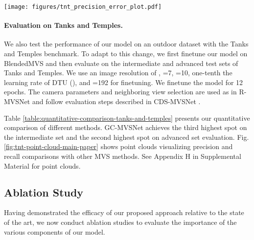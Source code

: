 \documentclass[10pt,twocolumn,letterpaper]{article}
\begin{document}
\begin{figure*}[t]
\begin{center}
    \vspace{-12pt}
    \texttt{[image: figures/tnt\_precision\_error\_plot.pdf]}
    \vspace{-13pt}
    \caption{Precision and recall comparison with other methods \cite{gu2019casmvsnet, yao2019recurrent, ma2021epp} for Train on Tanks and Temples benchmark.  is the scene-relevant distance threshold. Darker regions indicate larger error encountered with regard to . GC-MVSNet shows visual improvements with brighter regions for precision as well as recall metric.}
    \label{fig:tnt-point-cloud-main-paper}
    \vspace{-25pt}
\end{center}
\end{figure*}


\vspace{-12.5pt}
\paragraph{Evaluation on Tanks and Temples.}
We also test the
performance of our model on an outdoor dataset with the Tanks and Temples benchmark. To
adapt to this change, we first finetune our model on BlendedMVS and then
evaluate on the intermediate and advanced test sets of Tanks and Temples. We use an image
resolution of , =7, =10, one-tenth the learning rate of DTU (),
and =192 for finetuning. We finetune the model for 12 epochs.
The camera parameters and neighboring view
selection are used as in R-MVSNet \cite{yao2019recurrent} 
and follow
evaluation steps described in CDS-MVSNet
\cite{giang2022curvatureguided}.

Table
\ref{table:quantitative-comparison-tanks-and-temples} presents our
quantitative comparison of different methods. GC-MVSNet achieves the 
third highest spot on the intermediate set and the second highest spot on advanced set
evaluation. Fig. \ref{fig:tnt-point-cloud-main-paper} shows point clouds visualizing precision
and recall comparisons with other MVS methods. See Appendix H in Supplemental Material for point clouds.


\subsection{Ablation Study}\label{sec:ablation-study}

Having demonstrated the efficacy of our proposed approach relative to
the state of the art, we now conduct ablation studies 
to evaluate the importance of the various components of our model.
\end{document}
